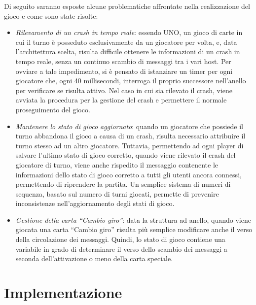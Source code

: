 \documentclass[11pt]{article} %
\begin{document}
Di seguito saranno esposte alcune problematiche affrontate nella realizzazione del gioco e come sono state risolte:
\begin{itemize}
  \item \emph{Rilevamento di un crash in tempo reale}: essendo UNO, un gioco di carte in cui il turno è posseduto esclusivamente da un giocatore per volta, e,
  data l'architettura scelta, risulta difficile ottenere le informazioni di un crash in tempo reale, senza un continuo scambio di messaggi tra i vari host.
  Per ovviare a tale impedimento, si è pensato di istanziare un timer per ogni giocatore che, ogni 40 millisecondi, interroga il proprio successore nell'anello
  per verificare se risulta attivo. Nel caso in cui sia rilevato il crash, viene avviata la procedura per la gestione del crash e permettere il normale 
  proseguimento del gioco.
  \item \emph{Mantenere lo stato di gioco aggiornato}: quando un giocatore che possiede il turno abbandona il gioco a causa di un crash, risulta necessario attribuire il turno stesso ad un altro giocatore. Tuttavia, permettendo ad ogni player di salvare l'ultimo stato di gioco corretto, quando viene rilevato il crash del 
  giocatore di turno, viene anche rispedito il messaggio contenente le informazioni dello stato di gioco corretto a tutti gli utenti ancora connessi, permettendo di riprendere la partita. Un semplice sistema di numeri di sequenza, basato sul numero di turni giocati, permette di prevenire inconsistenze nell'aggiornamento degli stati di gioco.
  \item \emph{Gestione della carta ``Cambio giro''}: data la struttura ad anello, quando viene giocata una carta ``Cambio giro'' risulta più semplice modificare
  anche il verso della circolazione dei messaggi. Quindi, lo stato di gioco contiene una variabile in grado di determinare il verso dello scambio dei messaggi
  a seconda dell'attivazione o meno della carta speciale.
\end{itemize}

\vspace{3mm}
\section{Implementazione}
\end{document}
